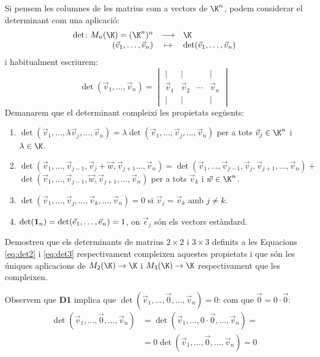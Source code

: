 Si pensem les columnes de les matrius com a vectors de $\K^n$, podem considerar el determinant com una aplicació:
$$
\begin{array}{rcl}
\det \colon M_n(\K)=(\K^n)^n & \longrightarrow & \K \\
(\vec v_1, \dots , \vec v_n) & \mapsto & \det(\vec v_1, \dots , \vec v_n)
\end{array}$$
i habitualment escriurem:
$$
\det(\vec v_1, \dots, \vec v_n)=\begin{vmatrix}
\mid & \mid & & \mid \\
\vec v_1 & \vec v_2 & \cdots & \vec v_n \\
\mid & \mid & & \mid
\end{vmatrix}
$$
Demanarem que el determinant compleixi les propietats següents:
\begin{enumerate}[\bf {D}1.]
    \item $\det(\vec v_1, \dots, \lambda \vec v_j, \dots,\vec v_n)=\lambda \det(\vec v_1, \dots, \vec v_j, \dots,\vec v_n)$ per a tots $\vec v_j\in \K^n$ i $\lambda \in \K$.
    \item $\det(\vec v_1, \dots, \vec v_{j-1}, \vec v_j+\vec w, \vec v_{j+1} \dots,\vec v_n)= \det(\vec v_1, \dots, \vec v_{j-1},\vec v_j,\vec v_{j+1}, \dots,\vec v_n) + $\\  $\det(\vec v_1, \dots, \vec v_{j-1},\vec w,\vec v_{j+1}, \dots,\vec v_n)$ per a tots $\vec v_k$ i $\vec w\in \K^n$.
    \item $\det(\vec v_1,\dots , \vec v_j, \dots, \vec v_k, \dots ,\vec v_n)=0$ si $\vec v_j=\vec v_k$ amb $j\neq k$.
    \item $\det(\mathbf{1}_n)=\det(\vec e_1, \dots, \vec e_n)=1$, on $\vec e_j$ són els vectors estàndard.
\end{enumerate}
\begin{exercici}
Demostreu que els determinants de matrius $2\times 2$ i $3\times 3$ definits a les Equacions \eqref{eq:det2} i \eqref{eq:det3} respectivament compleixen aquestes propietats i que són les úniques aplicacions de $M_2(\K) \to \K$ i $M_3(\K)\to\K$ respectivament que les compleixen.
\end{exercici}

\begin{observacio}\label{obs:det0}
Observem que \textbf{D1} implica que $\det(\vec v_1, \dots, \vec 0, \dots,\vec v_n)=0$: com que $\vec 0=0 \cdot \vec 0$:
\begin{align*}
\det(\vec v_1, \dots, \vec 0, \dots,\vec v_n) & = \det(\vec v_1, \dots, 0\cdot\vec 0, \dots,\vec v_n) = \\
& = 0 \det(\vec v_1, \dots, \vec 0, \dots,\vec v_n)=0
\end{align*}
\end{observacio}

